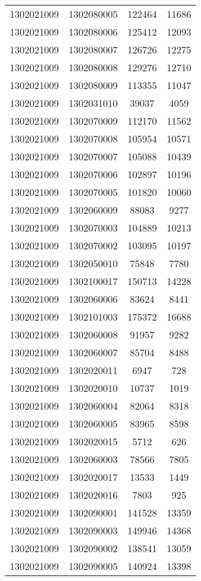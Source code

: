 \begin{longtable}{llcc}
1302021009 & 1302080005 & 122464 & 11686\\
1302021009 & 1302080006 & 125412 & 12093\\
1302021009 & 1302080007 & 126726 & 12275\\
1302021009 & 1302080008 & 129276 & 12710\\
1302021009 & 1302080009 & 113355 & 11047\\
1302021009 & 1302031010 & 39037 & 4059\\
1302021009 & 1302070009 & 112170 & 11562\\
1302021009 & 1302070008 & 105954 & 10571\\
1302021009 & 1302070007 & 105088 & 10439\\
1302021009 & 1302070006 & 102897 & 10196\\
1302021009 & 1302070005 & 101820 & 10060\\
1302021009 & 1302060009 & 88083 & 9277\\
1302021009 & 1302070003 & 104889 & 10213\\
1302021009 & 1302070002 & 103095 & 10197\\
1302021009 & 1302050010 & 75848 & 7780\\
1302021009 & 1302100017 & 150713 & 14228\\
1302021009 & 1302060006 & 83624 & 8441\\
1302021009 & 1302101003 & 175372 & 16688\\
1302021009 & 1302060008 & 91957 & 9282\\
1302021009 & 1302060007 & 85704 & 8488\\
1302021009 & 1302020011 & 6947 & 728\\
1302021009 & 1302020010 & 10737 & 1019\\
1302021009 & 1302060004 & 82064 & 8318\\
1302021009 & 1302060005 & 83965 & 8598\\
1302021009 & 1302020015 & 5712 & 626\\
1302021009 & 1302060003 & 78566 & 7805\\
1302021009 & 1302020017 & 13533 & 1449\\
1302021009 & 1302020016 & 7803 & 925\\
1302021009 & 1302090001 & 141528 & 13359\\
1302021009 & 1302090003 & 149946 & 14368\\
1302021009 & 1302090002 & 138541 & 13059\\
1302021009 & 1302090005 & 140924 & 13398\\

\end{longtable}
